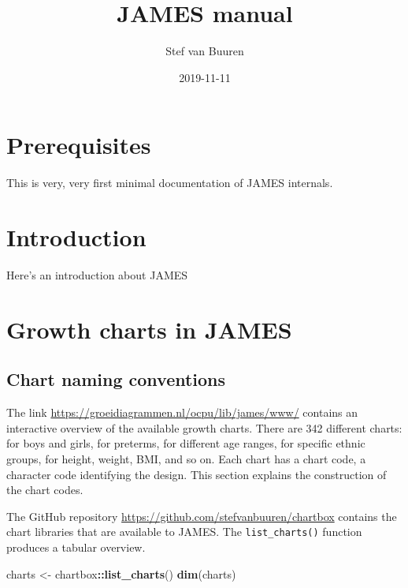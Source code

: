 \documentclass[]{book}
\title{JAMES manual}
\author{Stef van Buuren}
\date{2019-11-11}
\newenvironment{Shaded}{\begin{snugshade}}{\end{snugshade}}
\newcommand{\KeywordTok}[1]{\textcolor[rgb]{0.13,0.29,0.53}{\textbf{#1}}}
\newcommand{\NormalTok}[1]{#1}
\newcommand{\OperatorTok}[1]{\textcolor[rgb]{0.81,0.36,0.00}{\textbf{#1}}}
\newcommand{\StringTok}[1]{\textcolor[rgb]{0.31,0.60,0.02}{#1}}
\begin{document}
\maketitle

{
\setcounter{tocdepth}{1}
\tableofcontents
}
\hypertarget{prerequisites}{%
\chapter{Prerequisites}\label{prerequisites}}

This is very, very first minimal documentation of JAMES internals.

\hypertarget{intro}{%
\chapter{Introduction}\label{intro}}

Here's an introduction about JAMES

\hypertarget{growth-charts-in-james}{%
\chapter{Growth charts in JAMES}\label{growth-charts-in-james}}

\hypertarget{chart-naming-conventions}{%
\section{Chart naming conventions}\label{chart-naming-conventions}}

The link \url{https://groeidiagrammen.nl/ocpu/lib/james/www/} contains an interactive overview of the available growth charts. There are 342 different charts: for boys and girls, for preterms, for different age ranges, for specific ethnic groups, for height, weight, BMI, and so on. Each chart has a chart code, a character code identifying the design. This section explains the construction of the chart codes.

The GitHub repository \url{https://github.com/stefvanbuuren/chartbox} contains the chart libraries that are available to JAMES. The \texttt{list\_charts()} function produces a tabular overview.

\begin{Shaded}
\begin{Highlighting}[]
\NormalTok{charts <-}\StringTok{ }\NormalTok{chartbox}\OperatorTok{::}\KeywordTok{list_charts}\NormalTok{()}
\KeywordTok{dim}\NormalTok{(charts)}
\end{Highlighting}
\end{Shaded}
\end{document}

